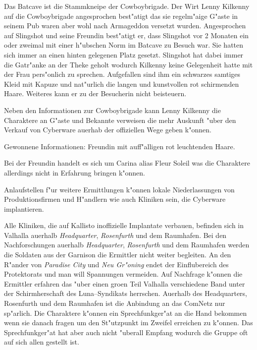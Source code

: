 
Das Batcave ist die Stammkneipe der Cowboybrigade. Der Wirt Lenny Kilkenny auf die Cowboybrigade angesprochen best"atigt das sie regelm"a\3ige G"aste in seinem Pub waren aber wohl nach Armageddon versetzt wurden. Angesprochen auf Slingshot und seine Freundin best"atigt er, dass Slingshot vor 2 Monaten ein oder zweimal mit einer h"ubschen Norm im Batcave zu Besuch war. Sie hatten sich immer an einen hinten gelegenen Platz gesetzt. Slingshot hat dabei immer die Gatr"anke an der Theke geholt wodurch Kilkenny keine Gelegenheit hatte mit der Frau pers"onlich zu sprechen. Aufgefallen sind ihm ein schwarzes samtiges Kleid mit Kapuze und nat"urlich die langen und kunstvollen rot schirmenden Haare. Weiteres kann er zu der Besucherin nicht beisteuern.

Neben den Informationen zur Cowboybrigade kann Lenny Kilkenny die Charaktere an G"aste und Bekannte verweisen die mehr Auskunft "uber den Verkauf von Cyberware au\3erhab der offiziellen Wege geben k"onnen.

\begin{remarks}
	Gewonnene Informationen: Freundin mit auff"alligen rot leuchtenden Haare. 
	
	Bei der Freundin handelt es sich um Carina alias Fleur Soleil was die Charaktere allerdings nicht in Erfahrung bringen k"onnen.
\end{remarks}	


Anlaufstellen f"ur weitere Ermittlungen k"onnen lokale Niederlassungen von Produktionsfirmen und H"andlern wie auch Kliniken sein, die Cyberware implantieren.

Alle Kliniken, die auf Kallisto inoffizielle Implantate verbauen, befinden sich in Valhalla au\3erhalb \emph{Headquarter}, \emph{Rosenfurth} und dem Raumhafen. Bei den Nachforschungen au\3erhalb \emph{Headquarter}, \emph{Rosenfurth} und dem Raumhafen werden die Soldaten aus der Garnison die Ermittler nicht weiter begleiten. An den R"ander von \emph{Paradise City} und \emph{Neu Gr"oning} endet der Einflu\3bereich des Protektorats und man will Spannungen vermeiden. Auf Nachfrage k"onnen die Ermittler erfahren das "uber einen gro\3en Teil Valhalla verschiedene Band unter der Schirmherschaft des Luna--Syndikats herrschen. Au\3erhalb des Headquarters, Rosenfurth und dem Raumhafen ist die Anbindung an das ComNetz nur sp"arlich. Die Charaktere k"onnen ein Sprechfunkger"at an die Hand bekommen wenn sie danach fragen um den St"utzpunkt im Zweifel erreichen zu k"onnen. Das Sprechfunkger"at hat aber auch nicht "uberall Empfang wodurch die Gruppe oft auf sich allen gestellt ist.

